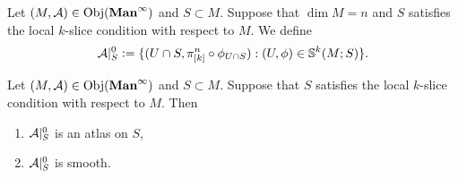 \documentclass{book}
\begin{document}
	\begin{defn}
		Let $(M, \mathcal{A}) \in \operatorname{Obj}(\operatorname*{\text{\textbf{Man}}^{\infty}})$ and $S \subset M$. Suppose that $\dim M = n$ and $S$ satisfies the local $k$-slice condition with respect to $M$. We define 
		$$\mathcal{A}|_S^0 \vcentcolon= \{(U \cap S, \pi^n_{[k]} \circ \phi_{U \cap S}): (U, \phi) \in \mathbb{S}^k(M; S)\}.$$
	\end{defn}

	\begin{ex}
		Let $(M, \mathcal{A}) \in \operatorname{Obj}(\operatorname*{\text{\textbf{Man}}^{\infty}})$ and $S \subset M$. Suppose that $S$ satisfies the local $k$-slice condition with respect to $M$. Then 
		\begin{enumerate}
			\item $\mathcal{A}|_S^0$ is an atlas on $S$,
			\item $\mathcal{A}|_S^0$ is smooth.
		\end{enumerate}
	\end{ex}
	
\end{document}
